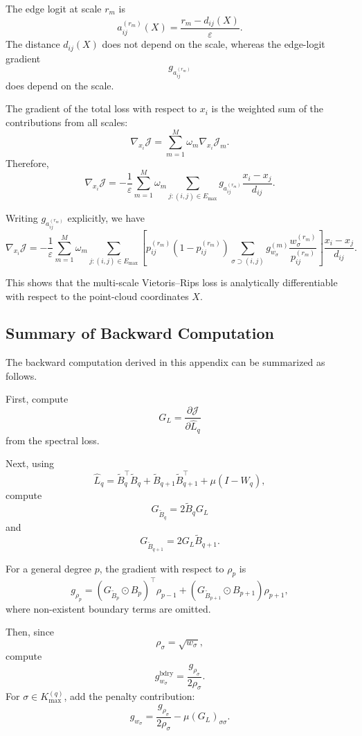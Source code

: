 \documentclass[pdflatex,sn-mathphys-ay]{sn-jnl}%
\theoremstyle{thmstyleone}%
\theoremstyle{thmstyletwo}%
\theoremstyle{thmstylethree}%
\begin{document}
\begin{appendices}
The edge logit at scale \(r_m\) is
\[
a_{ij}^{(r_m)}(X)
=
\frac{r_m-d_{ij}(X)}{\varepsilon}.
\]
The distance \(d_{ij}(X)\) does not depend on the scale, whereas the edge-logit gradient
\[
g_{a_{ij}^{(r_m)}}
\]
does depend on the scale.

The gradient of the total loss with respect to \(x_i\) is the weighted sum of the contributions from all scales:
\[
\nabla_{x_i}\mathcal{J}
=
\sum_{m=1}^{M}
\omega_m
\nabla_{x_i}\mathcal{J}_m.
\]
Therefore,
\[
\nabla_{x_i}\mathcal{J}
=
-\frac{1}{\varepsilon}
\sum_{m=1}^{M}
\omega_m
\sum_{j:(i,j)\in E_{\max}}
g_{a_{ij}^{(r_m)}}
\frac{x_i-x_j}{d_{ij}}.
\]

Writing \(g_{a_{ij}^{(r_m)}}\) explicitly, we have
\[
\nabla_{x_i}\mathcal{J}
=
-\frac{1}{\varepsilon}
\sum_{m=1}^{M}
\omega_m
\sum_{j:(i,j)\in E_{\max}}
\left[
p_{ij}^{(r_m)}
\left(
1-p_{ij}^{(r_m)}
\right)
\sum_{\sigma\supset(i,j)}
g_{w_\sigma}^{(m)}
\frac{
w_\sigma^{(r_m)}
}{
p_{ij}^{(r_m)}
}
\right]
\frac{x_i-x_j}{d_{ij}}.
\]

This shows that the multi-scale Vietoris--Rips loss is analytically differentiable with respect to the point-cloud coordinates \(X\).

\subsection{Summary of Backward Computation}

The backward computation derived in this appendix can be summarized as follows.

First, compute
\[
G_L
=
\frac{\partial\mathcal{J}}{\partial \widehat{L}_q}
\]
from the spectral loss.

Next, using
\[
\widehat{L}_q
=
\widetilde{B}_q^\top\widetilde{B}_q
+
\widetilde{B}_{q+1}\widetilde{B}_{q+1}^\top
+
\mu(I-W_q),
\]
compute
\[
G_{\widetilde{B}_q}
=
2\widetilde{B}_qG_L
\]
and
\[
G_{\widetilde{B}_{q+1}}
=
2G_L\widetilde{B}_{q+1}.
\]

For a general degree \(p\), the gradient with respect to \(\rho_p\) is
\[
g_{\rho_p}
=
\left(
G_{\widetilde{B}_p}
\odot
B_p
\right)^\top
\rho_{p-1}
+
\left(
G_{\widetilde{B}_{p+1}}
\odot
B_{p+1}
\right)
\rho_{p+1},
\]
where non-existent boundary terms are omitted.

Then, since
\[
\rho_\sigma=\sqrt{w_\sigma},
\]
compute
\[
g_{w_\sigma}^{\mathrm{bdry}}
=
\frac{g_{\rho_\sigma}}{2\rho_\sigma}.
\]
For \(\sigma\in K_{\max}^{(q)}\), add the penalty contribution:
\[
g_{w_\sigma}
=
\frac{g_{\rho_\sigma}}{2\rho_\sigma}
-
\mu(G_L)_{\sigma\sigma}.
\]


\end{appendices}
\end{document}
